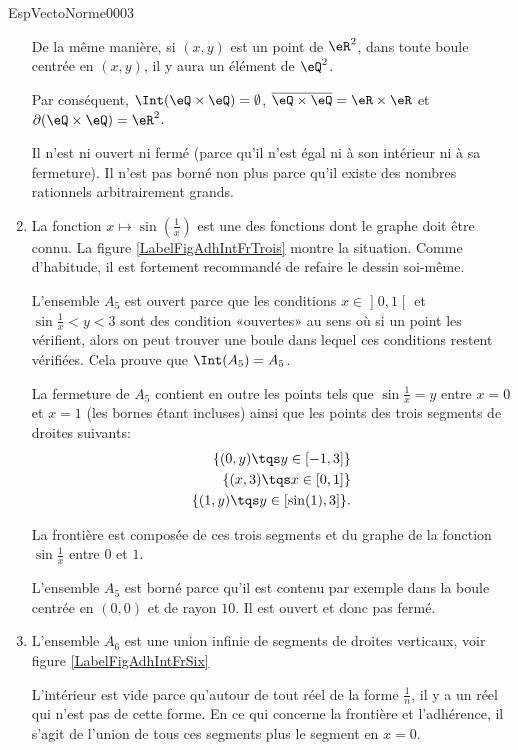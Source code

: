 \begin{corrige}{EspVectoNorme0003}
\begin{enumerate}
			De la même manière, si $(x,y)$ est un point de $\eR^2$, dans toute boule centrée en $(x,y)$, il y aura un élément de $\eQ^2$.

			Par conséquent, $\Int(\eQ\times\eQ)=\emptyset$, $\overline{ \eQ\times\eQ }=\eR\times\eR$ et $\partial(\eQ\times\eQ)=\eR^2$.

			Il n'est ni ouvert ni fermé (parce qu'il n'est égal ni à son intérieur ni à sa fermeture). Il n'est pas borné non plus parce qu'il existe des nombres rationnels arbitrairement grands.

		\item
			La fonction $x\mapsto\sin(\frac{1}{ x })$ est une des fonctions dont le graphe doit être connu. La figure \ref{LabelFigAdhIntFrTrois} montre la situation. Comme d'habitude, il est fortement recommandé de refaire le dessin soi-même.
\newcommand{\CaptionFigAdhIntFrTrois}{Les points qui dont sur l'axe vertical entre $0$ et $3$ sont sur la frontière, mais pas dans l'ensemble $A_5$.}


			L'ensemble $A_5$ est ouvert parce que les conditions $x\in\mathopen] 0 , 1 \mathclose[$ et $\sin\frac{1}{ x }<y<3$ sont des condition «ouvertes» au sens où si un point les vérifient, alors on peut trouver une boule dans lequel ces conditions restent vérifiées. Cela prouve que $\Int(A_5)=A_5$.

			La fermeture de $A_5$ contient en outre les points tels que $\sin\frac{1}{ x }=y$ entre $x=0$ et $x=1$ (les bornes étant incluses) ainsi que les points des trois segments de droites suivants:
			\begin{equation}
				\begin{aligned}[]
					\{ (0,y)\tqs y\in\mathopen[ -1 , 3 \mathclose] \}\\
					\{ (x,3)\tqs x\in\mathopen[ 0 , 1 \mathclose] \}\\
					\{ (1,y)\tqs y\in\mathopen[ \sin(1) , 3 \mathclose] \}.
				\end{aligned}
			\end{equation}

			La frontière est composée de ces trois segments et du graphe de la fonction $\sin\frac{1}{ x }$ entre $0$ et $1$.

			L'ensemble $A_5$ est borné parce qu'il est contenu par exemple dans la boule centrée en $(0,0)$ et de rayon $10$. Il est ouvert et donc pas fermé.

		\item
			L'ensemble $A_6$ est une union infinie de segments de droites verticaux, voir figure \ref{LabelFigAdhIntFrSix}
\newcommand{\CaptionFigAdhIntFrSix}{Le segment sur l'axe vertical entre $y=0$ et $y=1$ fait partie de l'adhérence et de la frontière, mais pas de l'ensemble $A_6$ lui-même.}

				L'intérieur est vide parce qu'autour de tout réel de la forme $\frac{1}{ n }$, il y a un réel qui n'est pas de cette forme. En ce qui concerne la frontière et l'adhérence, il s'agit de l'union de tous ces segments plus le segment en $x=0$.


\end{enumerate}
\end{corrige}
